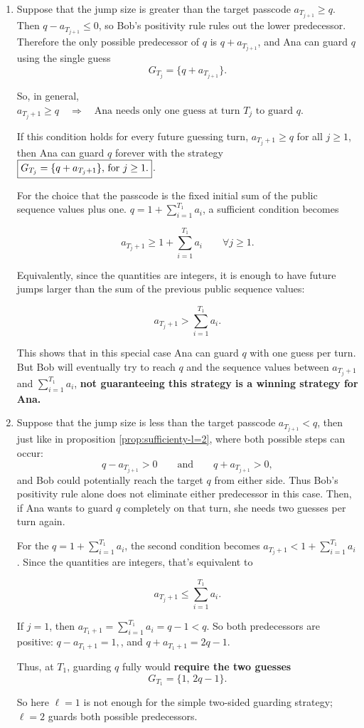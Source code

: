 \begin{enumerate}[label=(\textbf{Case \arabic*})]

\item\label{case:large-jump}
Suppose that the jump size is greater than the target passcode $a_{T_{j+1}}\geq q$. Then $q-a_{T_{j+1}}\leq0$, so Bob's positivity rule rules out the lower predecessor. Therefore the only possible predecessor of $q$ is $q+a_{T_{j+1}}$, and Ana can guard $q$ using the single guess
\[
\boxed{
G_{T_j}=\{q+a_{T_{j+1}}\}.
}
\]

So, in general, $ \boxed{ a_{T_j+1}\ge q \quad\Longrightarrow\quad \text{Ana needs only one guess at turn }T_j\text{ to guard }q. } $

\noindent
If this condition holds for every future guessing turn, $ a_{T_j+1}\ge q  $ for all $ j\ge1$, then Ana can guard \(q\) forever with the strategy $ \boxed{ G_{T_j}=\{q+a_{T_j+1}\}$, for $ j\ge1. } $.

\noindent
For the choice that the passcode is the fixed initial sum of the public sequence values plus one. $ q=1+\sum_{i=1}^{T_1}a_i$, a sufficient condition becomes

$$ \boxed{ a_{T_j+1} \ge 1+\sum_{i=1}^{T_1}a_i \qquad\forall j\ge1. } $$

Equivalently, since the quantities are integers, it is enough to have future jumps larger than the sum of the previous public sequence values:

$$ \boxed{ a_{T_j+1} > \sum_{i=1}^{T_1}a_i. } $$

This shows that in this special case Ana can guard $q$ with one guess per turn. But Bob will eventually try to reach $q$ and the sequence values between $a_{T_j+1}$ and $\sum_{i=1}^{T_1}a_i$, \textbf{not guaranteeing this strategy is a winning strategy for Ana.}

\item\label{case:small-jump}
Suppose that the jump size is less than the target passcode  $a_{T_{j+1}}<q$, then just like in proposition \ref{prop:sufficienty-l=2}, where both possible steps can occur:
\[
q-a_{T_{j+1}}>0
\qquad\text{and}\qquad
q+a_{T_{j+1}}>0,
\]
\noindent
and Bob could potentially reach the target $q$ from either side. Thus Bob's positivity rule alone does not eliminate either predecessor in this case. Then, if Ana wants to guard \(q\) completely on that turn, she needs two guesses per turn again.

For the $ q=1+\sum_{i=1}^{T_1}a_i$, the second condition becomes $a_{T_j+1} < 1+\sum_{i=1}^{T_1}a_i$. Since the quantities are integers, that's equivalent to

$$ \boxed{ a_{T_j+1}\le \sum_{i=1}^{T_1}a_i. } $$

If $j=1$, then $ a_{T_1+1}=\sum_{i=1}^{T_1}a_i=q-1<q$. So both predecessors are positive:
$ q-a_{T_1+1}=1, $, and $ q+a_{T_1+1}=2q-1$. 

Thus, at \(T_1\), guarding \(q\) fully would \textbf{require the two guesses}
$$ \boxed{ G_{T_1}=\{1,\,2q-1\}. } $$

So here \(\ell=1\) is not enough for the simple two-sided guarding strategy; \(\ell=2\) guards both possible predecessors.

\end{enumerate}

